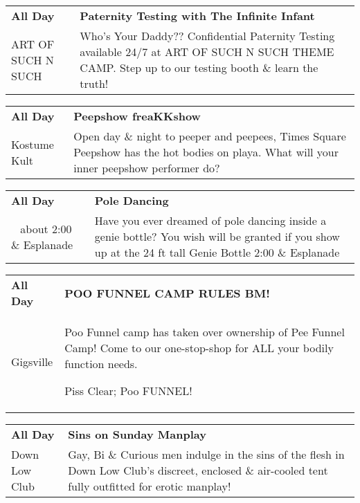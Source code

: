 \begin{tabular}{ p{1in} p{2.2in} }
    \textbf{All Day} & \textbf{Paternity Testing with The Infinite Infant} \\
    ART OF SUCH N SUCH \newline  & Who's Your Daddy?? Confidential Paternity Testing available 24/7 at ART OF SUCH N SUCH THEME CAMP. Step up to our testing booth \& learn the truth! \\
    \hline 
\end{tabular}
    
\begin{tabular}{ p{1in} p{2.2in} }
    \textbf{All Day} & \textbf{Peepshow freaKKshow} \\
    Kostume Kult \newline  & Open day \& night to peeper and peepees, Times Square Peepshow has the hot bodies on playa. What will your inner peepshow performer do? \\
    \hline 
\end{tabular}
    
\begin{tabular}{ p{1in} p{2.2in} }
    \textbf{All Day} & \textbf{Pole Dancing} \\
    ~ \newline about 2:00 \& Esplanade & Have you ever dreamed of pole dancing inside a genie bottle? You wish will be granted if you show up at the 24 ft tall Genie Bottle 2:00 \& Esplanade \\
    \hline 
\end{tabular}
    
\begin{tabular}{ p{1in} p{2.2in} }
    \textbf{All Day} & \textbf{POO FUNNEL CAMP RULES BM!} \\
    Gigsville \newline  & Poo Funnel camp has taken over ownership of Pee Funnel Camp! Come to our one-stop-shop for ALL your bodily function needs.

Piss Clear;
Poo FUNNEL! \\
    \hline 
\end{tabular}
    
\begin{tabular}{ p{1in} p{2.2in} }
    \textbf{All Day} & \textbf{Sins on Sunday Manplay} \\
    Down Low Club \newline  & Gay, Bi \& Curious men indulge in the sins of the flesh in Down Low Club's discreet, enclosed \& air-cooled tent fully outfitted for erotic manplay! \\
    \hline 
\end{tabular}
    
